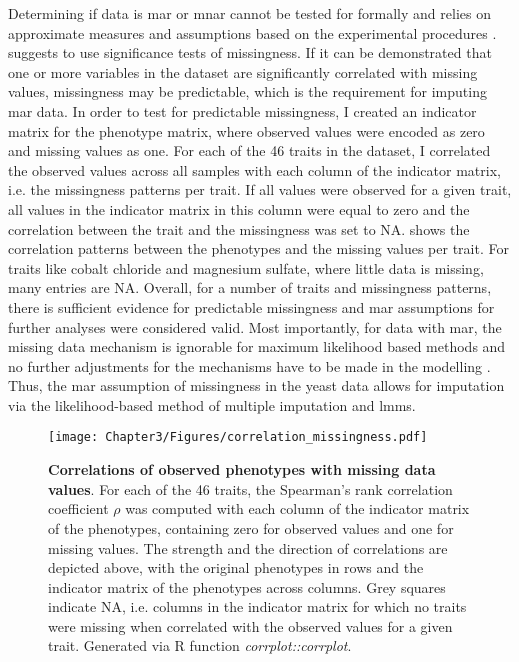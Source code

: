 Determining if data is \gls{mar} or \gls{mnar} cannot be tested for formally and relies on approximate measures and assumptions based on the experimental procedures \citep{Schafer2002,Garson2015,Templ2012}. \citet{Garson2015} suggests to use significance tests of missingness. If it can be demonstrated that one or more variables in the dataset are significantly correlated with missing values, missingness may be predictable, which is the requirement for imputing \gls{mar} data. In order to test for predictable missingness, I created an indicator matrix for the phenotype matrix, where observed values were encoded as zero and missing values as one. For each of the \num{46} traits in the dataset, I correlated the observed values across all samples with each column of the indicator matrix, i.e. the missingness patterns per trait. If all values were observed for a given trait, all values in the indicator matrix in this column were equal to zero and the correlation between the trait and the missingness was set to NA.  shows the correlation patterns between the phenotypes and the missing values per trait. For traits like cobalt chloride and magnesium sulfate, where little data is missing, many entries are NA. Overall, for a number of traits and missingness patterns, there is sufficient evidence for predictable missingness and \gls{mar} assumptions for further analyses were considered valid. Most importantly, for data with \gls{mar}, the missing data mechanism is ignorable for maximum likelihood based methods and no further adjustments for the mechanisms have to be made in the modelling \citep{Rubin1976,Little1988}. Thus, the \gls{mar} assumption of missingness in the yeast data allows for imputation via the likelihood-based method of multiple imputation and \glspl{lmm}.


\begin{figure}[hbtp]
	\centering
	\texttt{[image: Chapter3/Figures/correlation\_missingness.pdf]}
	\caption[\textbf{Correlations of observed phenotypes with missing data values.}]{\textbf{Correlations of observed phenotypes with missing data values}. For each of the \num{46} traits, the Spearman's rank correlation coefficient \(\rho\) was computed with each column of the indicator matrix of the phenotypes, containing zero for observed values and one for missing values. The strength and the direction of correlations are depicted above, with the original phenotypes in rows and the indicator matrix of the phenotypes across columns.  Grey squares indicate NA, i.e. columns in the indicator matrix for which no traits were missing when correlated with the observed values for a given trait. Generated via R function \textit{corrplot::corrplot}.}
 	\label{fig:missingnesscorrelations}
\end{figure}

